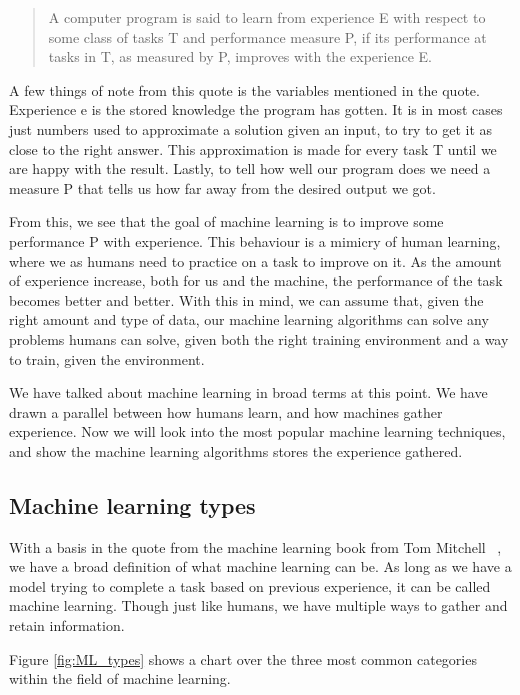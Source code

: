 \begin{quote}
 A computer program is said to learn from experience E with respect to some class of tasks T and performance measure P, if its performance at tasks in T, as measured by P, improves with the experience E. \cite{MitchellTomM1997Ml}

\end{quote} 
\label{ML}


\vspace{10px}
A few things of note from this quote is the variables mentioned in the quote. Experience e is the stored knowledge the program has gotten. It is in most cases just numbers used to approximate a solution given an input, to try to get it as close to the right answer. This approximation is made for every task T until we are happy with the result.
Lastly, to tell how well our program does we need a measure P that tells us how far away from the desired output we got.
   
From this, we see that the goal of machine learning is to improve some performance P with experience. This behaviour is a mimicry of human learning, where we as humans need to practice on a task to improve on it.
As the amount of experience increase, both for us and the machine, the performance of the task becomes better and better. With this in mind, we can assume that, given the right amount and type of data, our machine learning algorithms can solve any problems humans can solve, given both the right training environment and a way to train, given the environment.

We have talked about machine learning in broad terms at this point. We have drawn a parallel between how humans learn, and how machines gather experience.  Now we will look into the most popular machine learning techniques, and show the machine learning algorithms stores the experience gathered.
 
\subsection{Machine learning types}
With a basis in the quote from the machine learning book from Tom Mitchell~\cite{MitchellTomM1997Ml} , we have a broad definition of what machine learning can be.
As long as we have a model trying to complete a task based on previous experience, it can be called machine learning. Though just like humans, we have multiple ways to gather and retain information.

Figure \ref{fig:ML_types} shows a chart over the three most common categories within the field of machine learning. 

